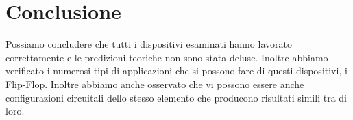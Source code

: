 \section*{Conclusione}

Possiamo concludere che tutti i dispositivi esaminati hanno lavorato correttamente e le predizioni teoriche non sono stata deluse. Inoltre abbiamo verificato i numerosi tipi di applicazioni che si possono fare di questi dispositivi, i Flip-Flop. Inoltre abbiamo anche osservato che vi possono essere anche configurazioni circuitali dello stesso elemento che producono risultati simili tra di loro.